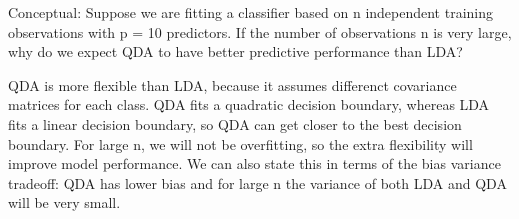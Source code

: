 \begin{Parts}
\Part
Conceptual: Suppose we are fitting a classifier based on n independent training observations with
p = 10 predictors. If the number of observations n is very large, why do we expect
QDA to have better predictive performance than LDA?\\
\begin{solution}
QDA is more flexible than LDA, because it assumes differenct covariance matrices for
each class. QDA fits a quadratic decision boundary, whereas LDA fits a linear decision
boundary, so QDA can get closer to the best decision boundary. For large n, we will
not be overfitting, so the extra flexibility will improve model performance. We can also
state this in terms of the bias variance tradeoff: QDA has lower bias and for large n
the variance of both LDA and QDA will be very small.
\end{solution}

\end{Parts}
